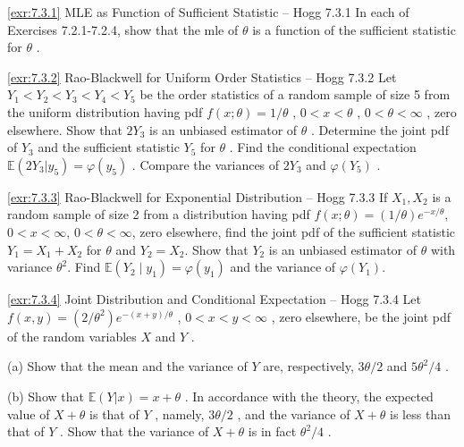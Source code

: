 \begin{exercise}{\ref{exr:7.3.1} MLE as Function of Sufficient Statistic – Hogg 7.3.1}\label{exr:7.3.1}
In each of Exercises 7.2.1-7.2.4, show that the mle of $\theta$ is a function of the sufficient statistic for $\theta$ .
\end{exercise}

\begin{exercise}{\ref{exr:7.3.2} Rao-Blackwell for Uniform Order Statistics – Hogg 7.3.2}\label{exr:7.3.2}
Let $Y_{1} < Y_{2} < Y_{3} < Y_{4} < Y_{5}$ be the order statistics of a random sample of size 5 from the uniform distribution having pdf $f(x; \theta) = 1 / \theta$ , $0 < x < \theta$ , $0 < \theta < \infty$ , zero elsewhere. Show that $2Y_{3}$ is an unbiased estimator of $\theta$ . Determine the joint pdf of $Y_{3}$ and the sufficient statistic $Y_{5}$ for $\theta$ . Find the conditional expectation $\mathbb{E}(2Y_{3}|y_{5}) = \varphi(y_{5})$ . Compare the variances of $2Y_{3}$ and $\varphi(Y_{5})$ .
\end{exercise}

\begin{exercise}{\ref{exr:7.3.3} Rao-Blackwell for Exponential Distribution – Hogg 7.3.3}\label{exr:7.3.3}
If $X_{1}, X_{2}$ is a random sample of size 2 from a distribution having pdf $f(x; \theta) = (1/\theta)e^{-x/\theta}$, $0 < x < \infty$, $0 < \theta < \infty$, zero elsewhere, find the joint pdf of the sufficient statistic $Y_{1} = X_{1} + X_{2}$ for $\theta$ and $Y_{2} = X_{2}$. Show that $Y_{2}$ is an unbiased estimator of $\theta$ with variance $\theta^{2}$. Find $\mathbb{E}(Y_{2} \mid y_{1}) = \varphi(y_{1})$ and the variance of $\varphi(Y_{1})$.
\end{exercise}

\begin{exercise}{\ref{exr:7.3.4} Joint Distribution and Conditional Expectation – Hogg 7.3.4}\label{exr:7.3.4}
Let $f(x,y) = (2 / \theta^2)e^{-(x + y) / \theta}$ , $0 < x < y < \infty$ , zero elsewhere, be the joint pdf of the random variables $X$ and $Y$ .

(a) Show that the mean and the variance of $Y$ are, respectively, $3\theta / 2$ and $5\theta^{2} / 4$ .

(b) Show that $\mathbb{E}(Y|x) = x + \theta$ . In accordance with the theory, the expected value of $X + \theta$ is that of $Y$ , namely, $3\theta / 2$ , and the variance of $X + \theta$ is less than that of $Y$ . Show that the variance of $X + \theta$ is in fact $\theta^2 / 4$ .
\end{exercise}

